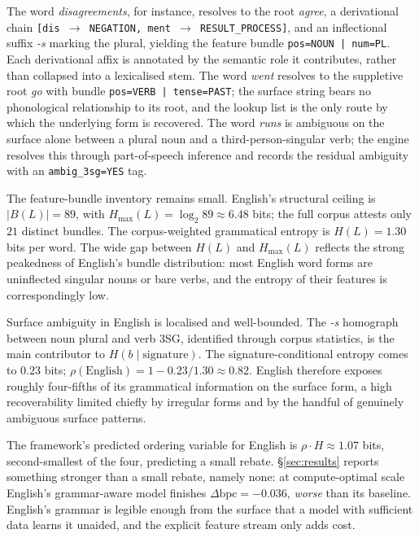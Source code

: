 The word \emph{disagreements}, for instance, resolves to the root \emph{agree}, a derivational chain \texttt{[dis $\to$ NEGATION, ment $\to$ RESULT\_PROCESS]}, and an inflectional suffix \emph{-s} marking the plural, yielding the feature bundle \texttt{pos=NOUN | num=PL}. Each derivational affix is annotated by the semantic role it contributes, rather than collapsed into a lexicalised stem. The word \emph{went} resolves to the suppletive root \emph{go} with bundle \texttt{pos=VERB | tense=PAST}; the surface string bears no phonological relationship to its root, and the lookup list is the only route by which the underlying form is recovered. The word \emph{runs} is ambiguous on the surface alone between a plural noun and a third-person-singular verb; the engine resolves this through part-of-speech inference and records the residual ambiguity with an \texttt{ambig\_3sg=YES} tag.

The feature-bundle inventory remains small. English's structural ceiling is $|B(L)| = 89$, with $H_{\max}(L) = \log_2 89 \approx 6.48$ bits; the full corpus attests only $21$ distinct bundles. The corpus-weighted grammatical entropy is $H(L) = 1.30$ bits per word. The wide gap between $H(L)$ and $H_{\max}(L)$ reflects the strong peakedness of English's bundle distribution: most English word forms are uninflected singular nouns or bare verbs, and the entropy of their features is correspondingly low.

Surface ambiguity in English is localised and well-bounded. The \emph{-s} homograph between noun plural and verb 3SG, identified through corpus statistics, is the main contributor to $H(b \mid \text{signature})$. The signature-conditional entropy comes to $0.23$ bits; $\rho(\text{English}) = 1 - 0.23 / 1.30 \approx 0.82$. English therefore exposes roughly four-fifths of its grammatical information on the surface form, a high recoverability limited chiefly by irregular forms and by the handful of genuinely ambiguous surface patterns.

The framework's predicted ordering variable for English is $\rho \cdot H \approx 1.07$ bits, second-smallest of the four, predicting a small rebate. \S\ref{sec:results} reports something stronger than a small rebate, namely none: at compute-optimal scale English's grammar-aware model finishes $\Delta\mathrm{bpc} = -0.036$, \emph{worse} than its baseline. English's grammar is legible enough from the surface that a model with sufficient data learns it unaided, and the explicit feature stream only adds cost.

